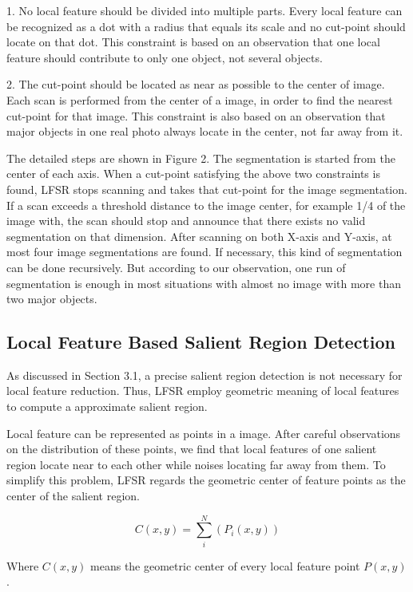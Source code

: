 1. No local feature should be divided into multiple parts. Every local feature can be recognized as a dot with a radius that equals its scale and no cut-point should locate on that dot. This constraint is based on an observation that one local feature should contribute to only one object, not several objects.

2. The cut-point should be located as near as possible to the center of image. Each scan is performed from the center of a image, in order to find the nearest cut-point for that image. This constraint is also based on an observation that major objects in one real photo always locate in the center, not far away from it.

The detailed steps are shown in Figure 2. The segmentation is started from the center of each axis. When a cut-point satisfying the above two constraints is found, LFSR stops scanning and takes that cut-point for the image segmentation. If a scan exceeds a threshold distance to the image center, for example 1/4 of the image with, the scan should stop and announce that there exists no valid segmentation on that dimension. After scanning on both X-axis and Y-axis, at most four image segmentations are found. If necessary, this kind of segmentation can be done recursively. But according to our observation, one run of segmentation is enough in most situations with almost no image with more than two major objects.

\subsection{Local Feature Based Salient Region Detection}

As discussed in Section 3.1, a precise salient region detection is not necessary for local feature reduction. Thus, LFSR employ geometric meaning of local features to compute a approximate salient region.

Local feature can be represented as points in a image. After careful observations on the distribution of these points, we find that local features of one salient region locate near to each other while noises locating far away from them. To simplify this problem, LFSR regards the geometric center of feature points as the center of the salient region.

{\begin{equation} \label{eq:center}
C(x, y) = \sum_{i}^{N}\left({P}_{i}(x, y) \right)
\end{equation}}

Where $C(x, y)$ means the geometric center of every local feature point $P(x, y)$.

